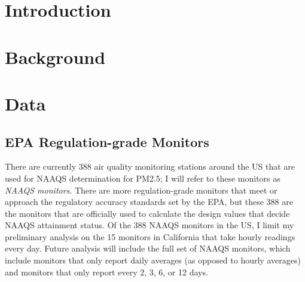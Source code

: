 \documentclass[12pt]{article}
\begin{document}

\section{Introduction} 
\label{introduction}


\section{Background} 
\label{background}






\section{Data} \label{data}


\subsection{EPA Regulation-grade Monitors}
There are currently 388 air quality monitoring stations around the US that are used for NAAQS determination for PM2.5; I will refer to these monitors as \textit{NAAQS monitors}. There are more regulation-grade monitors that meet or approach the regulatory accuracy standards set by the EPA, but these 388 are the monitors that are officially used to calculate the design values that decide NAAQS attainment status. Of the 388 NAAQS monitors in the US, I limit my preliminary analysis on the 15 monitors in California that take hourly readings every day. Future analysis will include the full set of NAAQS monitors, which include monitors that only report daily averages (as opposed to hourly averages) and monitors that only report every 2, 3, 6, or 12 days.
\end{document}
